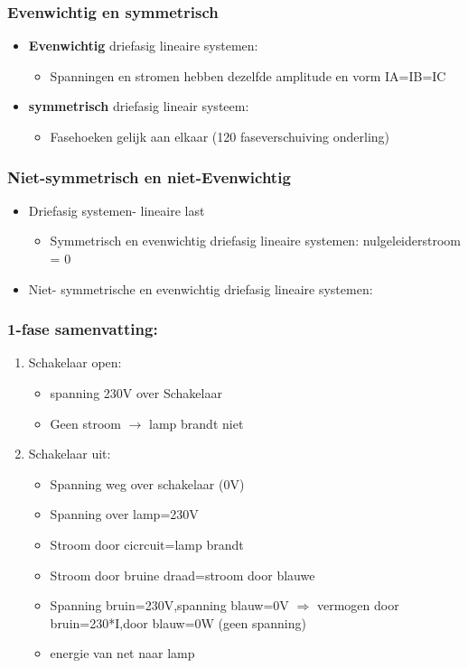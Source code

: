 \documentclass[12pt]{article}
\begin{document}
\subsubsection{Evenwichtig en symmetrisch}
\begin{itemize}
    \item \textbf{Evenwichtig} driefasig lineaire systemen:\begin{itemize}
        \item Spanningen en stromen hebben dezelfde amplitude en vorm IA=IB=IC
    \end{itemize}
    \item \textbf{symmetrisch} driefasig lineair systeem:\begin{itemize}
        \item Fasehoeken gelijk aan elkaar (120\textdegree{} faseverschuiving onderling)
    \end{itemize}
\end{itemize}
\subsubsection{Niet-symmetrisch en niet-Evenwichtig}
\begin{itemize}
    \item Driefasig systemen- lineaire last\begin{itemize}
        \item Symmetrisch en evenwichtig driefasig lineaire systemen: nulgeleiderstroom = 0
    \end{itemize}
    \item Niet- symmetrische en evenwichtig driefasig lineaire systemen:
\end{itemize}
\subsubsection{1-fase samenvatting:}
\begin{enumerate}
    \item Schakelaar open:\begin{itemize}
        \item spanning 230V over Schakelaar
        \item Geen stroom $\rightarrow$ lamp brandt niet
    \end{itemize}
    \item Schakelaar uit:\begin{itemize}
        \item Spanning weg over schakelaar (0V)
        \item Spanning over lamp=230V
        \item Stroom door cicrcuit=lamp brandt
        \item Stroom door bruine draad=stroom door blauwe
        \item Spanning bruin=230V,spanning blauw=0V $\Rightarrow$ vermogen door bruin=230*I,door blauw=0W (geen spanning)
        \item energie van net naar lamp
    \end{itemize}
\end{enumerate}
\end{document}
